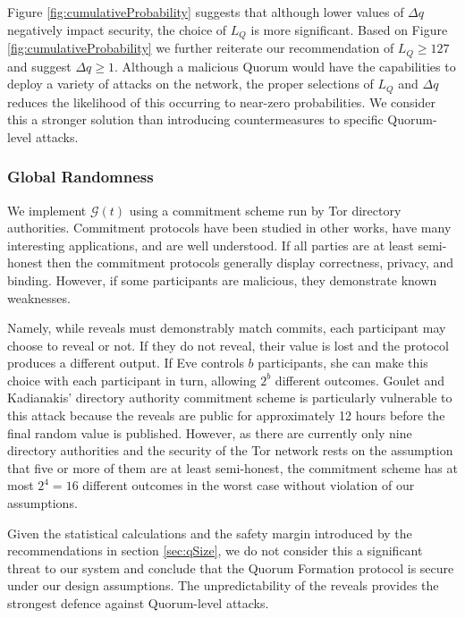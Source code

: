 \documentclass[conference]{IEEEtran}
\begin{document}
Figure \ref{fig:cumulativeProbability} suggests that although lower values of $ \Delta q $ negatively impact security, the choice of $ L_{Q} $ is more significant. Based on Figure \ref{fig:cumulativeProbability} we further reiterate our recommendation of $ L_{Q} \geq 127 $ and suggest $ \Delta q \geq 1 $. Although a malicious Quorum would have the capabilities to deploy a variety of attacks on the network, the proper selections of $ L_{Q} $ and $ \Delta q $ reduces the likelihood of this occurring to near-zero probabilities. We consider this a stronger solution than introducing countermeasures to specific Quorum-level attacks.

\subsubsection{Global Randomness}
\label{sec:RandGeneration}

We implement $ \mathcal{G}(t) $ using a commitment scheme run by Tor directory authorities\cite{GouletCommitReveal}. Commitment protocols have been studied in other works\cite{rivest1999unconditionally}\cite{naor1990bit}, have many interesting applications, and are well understood. If all parties are at least semi-honest then the commitment protocols generally display correctness, privacy, and binding. However, if some participants are malicious, they demonstrate known weaknesses. 

Namely, while reveals must demonstrably match commits, each participant may choose to reveal or not. If they do not reveal, their value is lost and the protocol produces a different output. If Eve controls $ b $ participants, she can make this choice with each participant in turn, allowing $ 2^{b} $ different outcomes. Goulet and Kadianakis' directory authority commitment scheme is particularly vulnerable to this attack because the reveals are public for approximately 12 hours before the final random value is published. However, as there are currently only nine directory authorities and the security of the Tor network rests on the assumption that five or more of them are at least semi-honest, the commitment scheme has at most $ 2^{4} = 16 $ different outcomes in the worst case without violation of our assumptions. 

Given the statistical calculations and the safety margin introduced by the recommendations in section \ref{sec:qSize}, we do not consider this a significant threat to our system and conclude that the Quorum Formation protocol is secure under our design assumptions. The unpredictability of the reveals provides the strongest defence against Quorum-level attacks.
\end{document}
